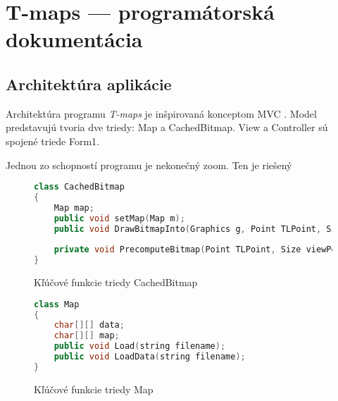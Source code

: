 \chapter{T-maps --- programátorská dokumentácia}
\label{programdoc}

\section{Architektúra aplikácie}
Architektúra programu \emph{T-maps} je inšpirovaná konceptom MVC \cite{krasner_mvc_1988}.
Model predstavujú tvoria dve triedy: Map a CachedBitmap.
View a Controller sú spojené triede Form1.


Jednou zo schopností programu je nekonečný zoom. Ten je riešený 
\begin{figure}[h]
\begin{lstlisting}[language=C++]
class CachedBitmap
{
    Map map;
    public void setMap(Map m);
    public void DrawBitmapInto(Graphics g, Point TLPoint, Size ViewPortSize, int squareS, bool isBichrom, bool forcePrecomputing = false);
 
    private void PrecomputeBitmap(Point TLPoint, Size viewPortSize);
}
\end{lstlisting}
\caption{Kľúčové funkcie triedy CachedBitmap}
\label{fig:cachedbitmap_interface_plus}
\end{figure}


\begin{figure}[h]
\begin{lstlisting}[language=C++]
class Map
{
    char[][] data;
    char[][] map;
    public void Load(string filename);
    public void LoadData(string filename);
}
\end{lstlisting}
\caption{Kľúčové funkcie triedy Map}
\label{fig:map_interface}
\end{figure}